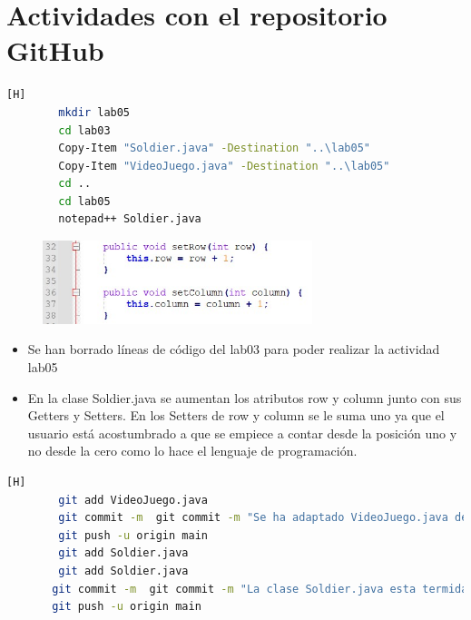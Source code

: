 \documentclass{article}
\begin{document}
	\section{Actividades con el repositorio GitHub}
	
	
	\begin{lstlisting}[language=bash,caption={Se iniciliaza el espacio de trabajo y se modifca la clase Soldier.java}][H]
		mkdir lab05
		cd lab03
		Copy-Item "Soldier.java" -Destination "..\lab05"
		Copy-Item "VideoJuego.java" -Destination "..\lab05"
		cd ..
		cd lab05
		notepad++ Soldier.java
	\end{lstlisting}
	
	\begin{figure}[H]
		\centering
		\includegraphics[width=0.7\textwidth,keepaspectratio]{img/1.jpg}
	\end{figure}
		
	
	\begin{itemize}	
		\item Se han borrado líneas de código del lab03 para poder realizar la actividad lab05 
		\item En la clase Soldier.java se aumentan los atributos row y column junto con sus Getters y Setters. En los Setters de row y column se le suma uno ya que el usuario está acostumbrado a que se empiece a contar desde la posición uno y no desde la cero como lo hace el lenguaje de programación.
	\end{itemize}
	

	
	\begin{lstlisting}[language=bash,caption={Commit: "Se ha adaptado VideoJuego.java del lab03 para el lab05, pero no se ha avanzado nada" }][H]
		git add VideoJuego.java
		git commit -m  git commit -m "Se ha adaptado VideoJuego.java del lab03 para el lab05 pero no se ha avanzado nada"
		git push -u origin main
		git add Soldier.java
		git add Soldier.java
	   git commit -m  git commit -m "La clase Soldier.java esta termida"
	   git push -u origin main
	\end{lstlisting}
	
	
	
\end{document}
